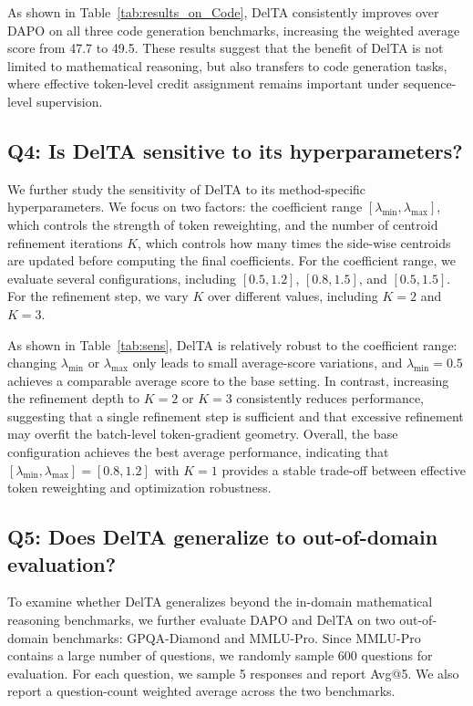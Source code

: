 \documentclass{article} %
\begin{document}
As shown in Table~\ref{tab:results_on_Code}, DelTA consistently improves over DAPO on all three code generation benchmarks, increasing the weighted average score from 47.7 to 49.5. These results suggest that the benefit of DelTA is not limited to mathematical reasoning, but also transfers to code generation tasks, where effective token-level credit assignment remains important under sequence-level supervision.





\subsection{Q4: Is DelTA sensitive to its hyperparameters?}
\label{app:hyp-sensitivity}


We further study the sensitivity of DelTA to its method-specific hyperparameters.
We focus on two factors: the coefficient range \([\lambda_{\min}, \lambda_{\max}]\), which controls the strength of token reweighting, and the number of centroid refinement iterations \(K\), which controls how many times the side-wise centroids are updated before computing the final coefficients.
For the coefficient range, we evaluate several configurations, including  \([0.5,1.2]\), \([0.8,1.5]\), and \([0.5,1.5]\).
For the refinement step, we vary \(K\) over different values, including  \(K=2\) and \(K=3\).

As shown in Table~\ref{tab:sens}, DelTA is relatively robust to the coefficient range: changing \(\lambda_{\min}\) or \(\lambda_{\max}\) only leads to small average-score variations, and \(\lambda_{\min}=0.5\) achieves a comparable average score to the base setting.
In contrast, increasing the refinement depth to \(K=2\) or \(K=3\) consistently reduces performance, suggesting that a single refinement step is sufficient and that excessive refinement may overfit the batch-level token-gradient geometry.
Overall, the base configuration achieves the best average performance, indicating that \([\lambda_{\min},\lambda_{\max}]=[0.8,1.2]\) with \(K=1\) provides a stable trade-off between effective token reweighting and optimization robustness.

\subsection{Q5: Does DelTA generalize to out-of-domain evaluation?}
\label{app:ood}

To examine whether DelTA generalizes beyond the in-domain mathematical reasoning benchmarks, we further evaluate DAPO and DelTA on two out-of-domain benchmarks: GPQA-Diamond and MMLU-Pro. Since MMLU-Pro contains a large number of questions, we randomly sample 600 questions for evaluation. For each question, we sample 5 responses and report Avg@5. We also report a question-count weighted average across the two benchmarks.
\end{document}
